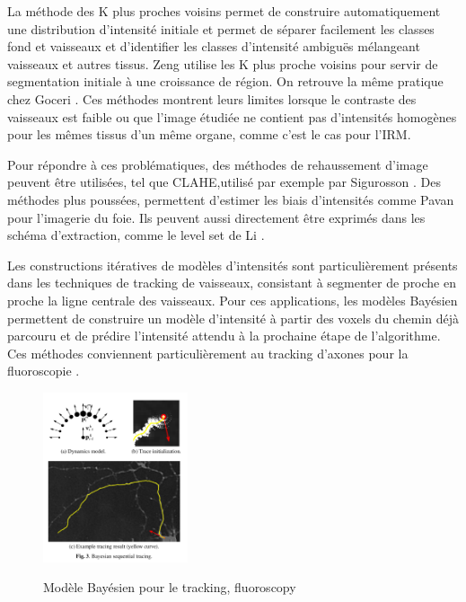 La méthode des K plus proches voisins permet de construire automatiquement une distribution d'intensité initiale et permet de séparer facilement les classes fond et vaisseaux et d'identifier les classes d'intensité ambiguës mélangeant vaisseaux et autres tissus. Zeng \cite{Zeng2018_auto_RG_AC_hepatic_vessels} utilise les K plus proche voisins pour servir de segmentation initiale à une croissance de région. On retrouve la même pratique chez Goceri \cite{Goceri2017_vessel}. Ces méthodes montrent leurs limites lorsque le contraste des vaisseaux est faible ou que l'image étudiée ne contient pas d'intensités homogènes pour les mêmes tissus d'un même organe, comme c'est le cas pour l'IRM.

Pour répondre à ces problématiques, des méthodes de rehaussement d'image peuvent être utilisées, tel que CLAHE,utilisé par exemple par Sigurosson \cite{Sigurosson2014_retinal_morpho_fuzzy}. Des méthodes plus poussées, permettent d'estimer les biais d'intensités comme Pavan \cite{Pavan2018_HCC_detection} pour l'imagerie du foie. Ils peuvent aussi directement être exprimés dans les schéma d'extraction, comme le level set de Li \cite{Li2011_mri_level_set}.

Les constructions itératives de modèles d'intensités sont particulièrement présents dans les techniques de tracking de vaisseaux, consistant à segmenter de proche en proche la ligne centrale des vaisseaux. Pour ces applications, les modèles Bayésien permettent de construire un modèle d'intensité à partir des voxels du chemin déjà parcouru et de prédire l'intensité attendu à la prochaine étape de l'algorithme. Ces méthodes conviennent particulièrement au tracking d'axones pour la fluoroscopie \cite{Radojevic2015_fuzzy_logic}\cite{Radojevic2017_neurons_bayesian_tracing_density}.

\begin{figure}
  \centering
  \includegraphics[height=5cm]{Images/bayesian_tracing.png}
  \label{fig:modele bayesien}
  \caption{Modèle Bayésien pour le tracking, fluoroscopy}
\end{figure}

